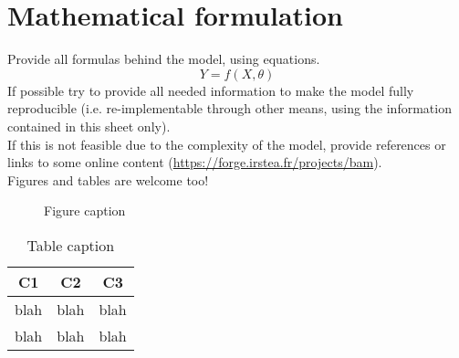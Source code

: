 \documentclass[a4paper]{article}
\begin{document}
\section{Mathematical formulation}
Provide all formulas behind the model, using equations.
%
\begin{equation}
Y=f(X,\theta)
\label{eq:formula}
\end{equation}
%
If possible try to provide all needed information to make the model fully reproducible (i.e. re-implementable through other means, using the information contained in this sheet only).\\
If this is not feasible due to the complexity of the model, provide references \cite{Doe2015} or links to some online content (\url{https://forge.irstea.fr/projects/bam}).\\
Figures and tables are welcome too!
%
\begin{center}
   \begin{figure} [!htbp]
    \caption{Figure caption}
    \label{fig:figure}
   \end{figure}
 \end{center}
%
\begin{table}[!htbp]
	\centering
	\begin{tabular}{ccc}
		\hline
		C1 & C2 & C3 \\
		\hline
		blah & blah & blah \\
		\hline
		blah & blah & blah\\
		\hline
	\end{tabular}
	\caption{Table caption}
	\label{tab:table}
\end{table}
%
\end{document}
